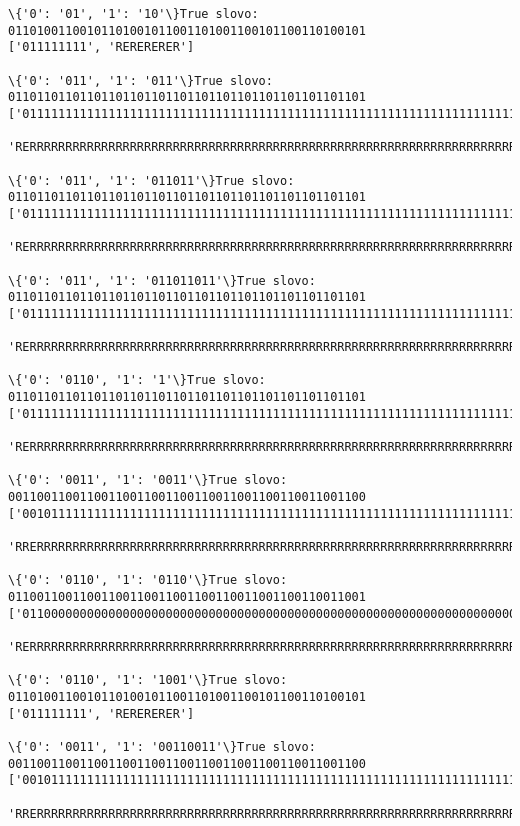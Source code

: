 \documentclass{article}
\begin{document}
    \begin{Verbatim}[commandchars=\\\{\}]
\{'0': '01', '1': '10'\}True slovo: 01101001100101101001011001101001100101100110100101
['011111111', 'RERERERER']

\{'0': '011', '1': '011'\}True slovo: 01101101101101101101101101101101101101101101101101
['01111111111111111111111111111111111111111111111111111111111111111111111111111111111111111111111111111',
 'RERRRRRRRRRRRRRRRRRRRRRRRRRRRRRRRRRRRRRRRRRRRRRRRRRRRRRRRRRRRRRRRRRRRRRRRRRRRRRRRRRRRRRRRRRRRRRRRRRRR']

\{'0': '011', '1': '011011'\}True slovo: 01101101101101101101101101101101101101101101101101
['01111111111111111111111111111111111111111111111111111111111111111111111111111111111111111111111111111',
 'RERRRRRRRRRRRRRRRRRRRRRRRRRRRRRRRRRRRRRRRRRRRRRRRRRRRRRRRRRRRRRRRRRRRRRRRRRRRRRRRRRRRRRRRRRRRRRRRRRRR']

\{'0': '011', '1': '011011011'\}True slovo: 01101101101101101101101101101101101101101101101101
['01111111111111111111111111111111111111111111111111111111111111111111111111111111111111111111111111111',
 'RERRRRRRRRRRRRRRRRRRRRRRRRRRRRRRRRRRRRRRRRRRRRRRRRRRRRRRRRRRRRRRRRRRRRRRRRRRRRRRRRRRRRRRRRRRRRRRRRRRR']

\{'0': '0110', '1': '1'\}True slovo: 01101101101101101101101101101101101101101101101101
['01111111111111111111111111111111111111111111111111111111111111111111111111111111111111111111111111111',
 'RERRRRRRRRRRRRRRRRRRRRRRRRRRRRRRRRRRRRRRRRRRRRRRRRRRRRRRRRRRRRRRRRRRRRRRRRRRRRRRRRRRRRRRRRRRRRRRRRRRR']

\{'0': '0011', '1': '0011'\}True slovo: 00110011001100110011001100110011001100110011001100
['001011111111111111111111111111111111111111111111111111111111111111111111111111',
 'RRERRRRRRRRRRRRRRRRRRRRRRRRRRRRRRRRRRRRRRRRRRRRRRRRRRRRRRRRRRRRRRRRRRRRRRRRRRE']

\{'0': '0110', '1': '0110'\}True slovo: 01100110011001100110011001100110011001100110011001
['01100000000000000000000000000000000000000000000000000000000000000000000000000',
 'RERRRRRRRRRRRRRRRRRRRRRRRRRRRRRRRRRRRRRRRRRRRRRRRRRRRRRRRRRRRRRRRRRRRRRRRRRRR']

\{'0': '0110', '1': '1001'\}True slovo: 01101001100101101001011001101001100101100110100101
['011111111', 'RERERERER']

\{'0': '0011', '1': '00110011'\}True slovo: 00110011001100110011001100110011001100110011001100
['001011111111111111111111111111111111111111111111111111111111111111111111111111',
 'RRERRRRRRRRRRRRRRRRRRRRRRRRRRRRRRRRRRRRRRRRRRRRRRRRRRRRRRRRRRRRRRRRRRRRRRRRRRE']


\end{Verbatim}
\end{document}
